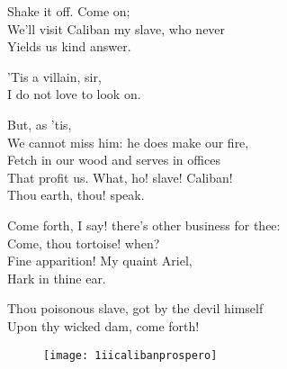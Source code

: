 \begin{verse_speech}[Prospero] 
Shake it off. Come on;\\
We'll visit Caliban my slave, who never\\
Yields us kind answer.
\end{verse_speech}

\begin{verse_speech}[Miranda] 
'Tis a villain, sir,\\
I do not love to look on.
\end{verse_speech}

\begin{verse_speech}[Prospero] 
But, as 'tis,\\
We cannot miss him: he does make our fire,\\
Fetch in our wood and serves in offices\\
That profit us. What, ho! slave! Caliban!\\
Thou earth, thou! speak.
\end{verse_speech}


\begin{verse_speech}[Prospero] 
Come forth, I say! there's other business for thee:\\
Come, thou tortoise! when?\\
Fine apparition! My quaint Ariel,\\
Hark in thine ear.
\end{verse_speech}


\exit{}

\begin{verse_speech}[Prospero] 
Thou poisonous slave, got by the devil himself\\
Upon thy wicked dam, come forth!
\end{verse_speech}

\begin{figure}[tbh]
\centering
\texttt{[image: 1iicalibanprospero]}
\end{figure}

